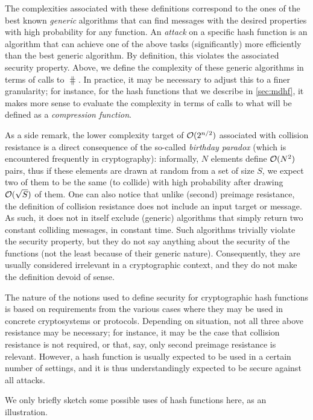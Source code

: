 The complexities associated with these definitions correspond to the ones of the best known \emph{generic} algorithms that can find messages with the desired
properties with high probability for any function. An \emph{attack} on a specific hash function is an algorithm that can achieve one of the above tasks (significantly)
more efficiently than the best generic algorithm. By definition, this violates the associated security property.
Above, we define the complexity of these generic algorithms in terms of calls to $\hash$. In practice, it may be necessary to adjust
this to a finer granularity; for instance, for the \merkdam hash functions that we describe in \autoref{sec:mdhf}, it makes more sense to evaluate the complexity
in terms of calls to what will be defined as a \emph{compression function}.

As a side remark, the lower complexity target of $\operatorname{\mathcal{O}}(2^{n/2})$ associated with collision resistance is a direct consequence of the so-called \emph{birthday paradox} (which
is encountered frequently in cryptography): informally,
$N$ elements define $\operatorname{\mathcal{O}}(N^2)$ pairs, thus if these elements are drawn at random from a set of size $S$, we expect two of them to be the same (\ie to collide)
with high probability after drawing $\operatorname{\mathcal{O}}(\sqrt{S})$ of them.
One can also notice that unlike (second) preimage resistance, the definition of collision resistance does not include an input target or message. As such, it does not in itself
exclude (generic) algorithms that simply return two constant colliding messages, in constant time. Such algorithms trivially violate the security property, but
they do not say anything about the security of the functions (not the least because of their generic nature). Consequently, they are usually considered irrelevant in a cryptographic context, and they do not make
the definition devoid of sense.

\bigskip

The nature of the notions used to define security for cryptographic hash functions is based on requirements from the various cases where they may be used in concrete cryptosystems or protocols.
Depending on situation, not all three above resistance may be necessary; for instance, it may be the case that collision resistance is not required, or that, say, only second preimage resistance
is relevant. However, a hash function is usually expected to be used in a certain number of settings, and it is thus understandingly expected to be secure against all attacks.

We only briefly sketch some possible uses of hash functions here, as an illustration.

